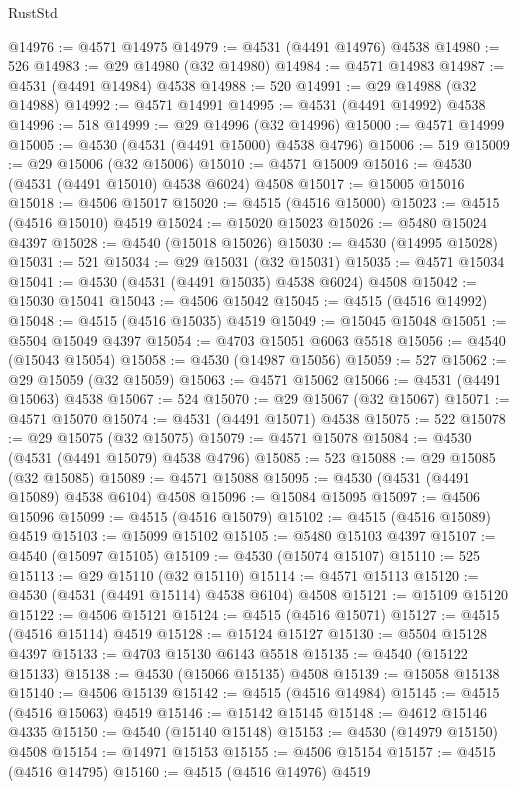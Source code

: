 \begin{lexlean}{RustStd}
\begin{coremodule}
{\begin{coremodule}
{{{{{{{{{{{{{{{{{{{{{{{{{{{{{{{{{{{{{{{{{{{{{{{{{{{{{{{@14976 := @4571 @14975
@14979 := @4531 (@4491 @14976) @4538
@14980 := 526
@14983 := @29 @14980 (@32 @14980)
@14984 := @4571 @14983
@14987 := @4531 (@4491 @14984) @4538
@14988 := 520
@14991 := @29 @14988 (@32 @14988)
@14992 := @4571 @14991
@14995 := @4531 (@4491 @14992) @4538
@14996 := 518
@14999 := @29 @14996 (@32 @14996)
@15000 := @4571 @14999
@15005 := @4530 (@4531 (@4491 @15000) @4538 @4796)
@15006 := 519
@15009 := @29 @15006 (@32 @15006)
@15010 := @4571 @15009
@15016 := @4530 (@4531 (@4491 @15010) @4538 @6024) @4508
@15017 := @15005 @15016
@15018 := @4506 @15017
@15020 := @4515 (@4516 @15000)
@15023 := @4515 (@4516 @15010) @4519
@15024 := @15020 @15023
@15026 := @5480 @15024 @4397
@15028 := @4540 (@15018 @15026)
@15030 := @4530 (@14995 @15028)
@15031 := 521
@15034 := @29 @15031 (@32 @15031)
@15035 := @4571 @15034
@15041 := @4530 (@4531 (@4491 @15035) @4538 @6024) @4508
@15042 := @15030 @15041
@15043 := @4506 @15042
@15045 := @4515 (@4516 @14992)
@15048 := @4515 (@4516 @15035) @4519
@15049 := @15045 @15048
@15051 := @5504 @15049 @4397
@15054 := @4703 @15051 @6063 @5518
@15056 := @4540 (@15043 @15054)
@15058 := @4530 (@14987 @15056)
@15059 := 527
@15062 := @29 @15059 (@32 @15059)
@15063 := @4571 @15062
@15066 := @4531 (@4491 @15063) @4538
@15067 := 524
@15070 := @29 @15067 (@32 @15067)
@15071 := @4571 @15070
@15074 := @4531 (@4491 @15071) @4538
@15075 := 522
@15078 := @29 @15075 (@32 @15075)
@15079 := @4571 @15078
@15084 := @4530 (@4531 (@4491 @15079) @4538 @4796)
@15085 := 523
@15088 := @29 @15085 (@32 @15085)
@15089 := @4571 @15088
@15095 := @4530 (@4531 (@4491 @15089) @4538 @6104) @4508
@15096 := @15084 @15095
@15097 := @4506 @15096
@15099 := @4515 (@4516 @15079)
@15102 := @4515 (@4516 @15089) @4519
@15103 := @15099 @15102
@15105 := @5480 @15103 @4397
@15107 := @4540 (@15097 @15105)
@15109 := @4530 (@15074 @15107)
@15110 := 525
@15113 := @29 @15110 (@32 @15110)
@15114 := @4571 @15113
@15120 := @4530 (@4531 (@4491 @15114) @4538 @6104) @4508
@15121 := @15109 @15120
@15122 := @4506 @15121
@15124 := @4515 (@4516 @15071)
@15127 := @4515 (@4516 @15114) @4519
@15128 := @15124 @15127
@15130 := @5504 @15128 @4397
@15133 := @4703 @15130 @6143 @5518
@15135 := @4540 (@15122 @15133)
@15138 := @4530 (@15066 @15135) @4508
@15139 := @15058 @15138
@15140 := @4506 @15139
@15142 := @4515 (@4516 @14984)
@15145 := @4515 (@4516 @15063) @4519
@15146 := @15142 @15145
@15148 := @4612 @15146 @4335
@15150 := @4540 (@15140 @15148)
@15153 := @4530 (@14979 @15150) @4508
@15154 := @14971 @15153
@15155 := @4506 @15154
@15157 := @4515 (@4516 @14795)
@15160 := @4515 (@4516 @14976) @4519
}}}}}}}}}}}}}}}}}}}}}}}}}}}}}}}}}}}}}}}}}}}}}}}}}}}}}}}
\end{coremodule}}
\end{coremodule}
\end{lexlean}
